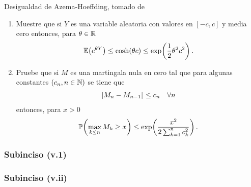 Desigualdad de Azema-Hoeffding, tomado de \cite[E14.2, p.237]{MR1155402}
\begin{enumerate}
    \item[(v.i)]    [\ref{problema2_3:subinciso5_1}]
         Muestre que si $Y$ es una variable aleatoria con valores en $[-c,c]$ y media cero entonces, para $\theta\in\mathbb{R}$
        \begin{align}
            \mathbb{E}\! \left( e^{\theta Y} \right)\leq\cosh\!\left( \theta c\right) \leq \exp\!\left( \frac{1}{2}\theta^2c^2\right) . 
        \end{align}

    \item[(v.ii)]    [\ref{problema2_3:subinciso5_2}]
        Pruebe que si $M$ es una martingala nula en cero tal que para algunas constantes $\left( c_n,n\in\mathbb{N}\right) $ se tiene que
        \begin{align}
            \hspace{.25mm}\left|M_n-M_{n-1}\right|\hspace{.25mm}\leq c_n\quad\forall n
        \end{align}
        entonces, para $x>0$
        \begin{align}
            \mathbb{P}\! \left( \max_{k\leq n} M_k\geq x \right)\leq \exp\!\left( \frac{x^2}{2\sum_{k=1}^n c_k^2}\right) .
        \end{align}
\end{enumerate}
    
\subsubsection{Subinciso (v.1)}     \label{problema2_3:subinciso5_1}
    
    \newpage
    
\subsubsection{Subinciso (v.ii)}    \label{problema2_3:subinciso5_2} 
    

